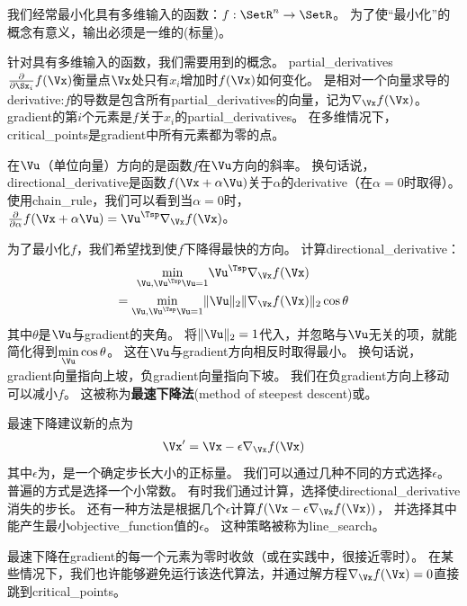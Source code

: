我们经常最小化具有多维输入的函数：$f: \SetR^n \rightarrow \SetR $。 
为了使``最小化''的概念有意义，输出必须是一维的(标量)。


针对具有多维输入的函数，我们需要用到的概念。
\gls{partial_derivatives} $\frac{\partial}{\partial \Sx_i}f(\Vx)$衡量点$\Vx$处只有$x_i$增加时$f(\Vx)$如何变化。
是相对一个向量求导的\gls{derivative}:$f$的导数是包含所有\gls{partial_derivatives}的向量，记为$\nabla_{\Vx} f(\Vx)$。
\gls{gradient}的第$i$个元素是$f$关于$x_i$的\gls{partial_derivatives}。
在多维情况下，\gls{critical_points}是\gls{gradient}中所有元素都为零的点。

在$\Vu$（单位向量）方向的是函数$f$在$\Vu$方向的斜率。
换句话说，\gls{directional_derivative}是函数$f(\Vx + \alpha \Vu)$关于$\alpha$的\gls{derivative}（在$\alpha = 0$时取得）。
使用\gls{chain_rule}，我们可以看到当$\alpha=0$时，$\frac{\partial}{\partial \alpha} f(\Vx + \alpha \Vu) = \Vu^\Tsp \nabla_{\Vx} f(\Vx)$。

为了最小化$f$，我们希望找到使$f$下降得最快的方向。
计算\gls{directional_derivative}：
\begin{align}
 \underset{\Vu, \Vu^\Tsp\Vu = 1}{\min} \Vu^\Tsp & \nabla_{\Vx} f(\Vx) \\
 = \underset{\Vu, \Vu^\Tsp\Vu = 1}{\min} \| \Vu \|_2 \| &\nabla_{\Vx}f(\Vx) \|_2 \cos \theta
\end{align}
其中$\theta$是$\Vu$与\gls{gradient}的夹角。
将$ \| \Vu \|_2 = 1$代入，并忽略与$\Vu$无关的项，就能简化得到$ \underset{\Vu}{\min} \cos \theta $。 
这在$\Vu$与\gls{gradient}方向相反时取得最小。
换句话说，\gls{gradient}向量指向上坡，负\gls{gradient}向量指向下坡。
我们在负\gls{gradient}方向上移动可以减小$f$。
这被称为\textbf{最速下降法}(method of steepest descent)或。

最速下降建议新的点为
\begin{align}
  \Vx' = \Vx - \epsilon \nabla_{\Vx} f(\Vx)
\end{align}
其中$\epsilon$为，是一个确定步长大小的正标量。
我们可以通过几种不同的方式选择$\epsilon$。
普遍的方式是选择一个小常数。
有时我们通过计算，选择使\gls{directional_derivative}消失的步长。
还有一种方法是根据几个$\epsilon$计算$f(\Vx - \epsilon \nabla_{\Vx} f(\Vx))$， 并选择其中能产生最小\gls{objective_function}值的$\epsilon$。
这种策略被称为\gls{line_search}。

最速下降在\gls{gradient}的每一个元素为零时收敛（或在实践中，很接近零时）。
在某些情况下，我们也许能够避免运行该迭代算法，并通过解方程$\nabla_{\Vx} f(\Vx)= 0$直接跳到\gls{critical_points}。

